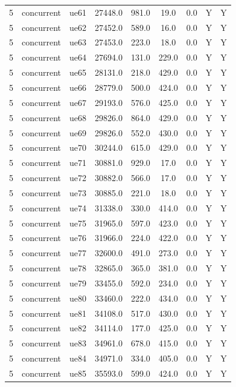 \begin{table}[ht]
\begin{tabular}{|c|c|c|c|c|c|c|c|c|}
5 & concurrent & ue61 & 27448.0 & 981.0 & 19.0 & 0.0 & Y & Y \\
5 & concurrent & ue62 & 27452.0 & 589.0 & 16.0 & 0.0 & Y & Y \\
5 & concurrent & ue63 & 27453.0 & 223.0 & 18.0 & 0.0 & Y & Y \\
5 & concurrent & ue64 & 27694.0 & 131.0 & 229.0 & 0.0 & Y & Y \\
5 & concurrent & ue65 & 28131.0 & 218.0 & 429.0 & 0.0 & Y & Y \\
5 & concurrent & ue66 & 28779.0 & 500.0 & 424.0 & 0.0 & Y & Y \\
5 & concurrent & ue67 & 29193.0 & 576.0 & 425.0 & 0.0 & Y & Y \\
5 & concurrent & ue68 & 29826.0 & 864.0 & 429.0 & 0.0 & Y & Y \\
5 & concurrent & ue69 & 29826.0 & 552.0 & 430.0 & 0.0 & Y & Y \\
5 & concurrent & ue70 & 30244.0 & 615.0 & 429.0 & 0.0 & Y & Y \\
5 & concurrent & ue71 & 30881.0 & 929.0 & 17.0 & 0.0 & Y & Y \\
5 & concurrent & ue72 & 30882.0 & 566.0 & 17.0 & 0.0 & Y & Y \\
5 & concurrent & ue73 & 30885.0 & 221.0 & 18.0 & 0.0 & Y & Y \\
5 & concurrent & ue74 & 31338.0 & 330.0 & 414.0 & 0.0 & Y & Y \\
5 & concurrent & ue75 & 31965.0 & 597.0 & 423.0 & 0.0 & Y & Y \\
5 & concurrent & ue76 & 31966.0 & 224.0 & 422.0 & 0.0 & Y & Y \\
5 & concurrent & ue77 & 32600.0 & 491.0 & 273.0 & 0.0 & Y & Y \\
5 & concurrent & ue78 & 32865.0 & 365.0 & 381.0 & 0.0 & Y & Y \\
5 & concurrent & ue79 & 33455.0 & 592.0 & 234.0 & 0.0 & Y & Y \\
5 & concurrent & ue80 & 33460.0 & 222.0 & 434.0 & 0.0 & Y & Y \\
5 & concurrent & ue81 & 34108.0 & 517.0 & 430.0 & 0.0 & Y & Y \\
5 & concurrent & ue82 & 34114.0 & 177.0 & 425.0 & 0.0 & Y & Y \\
5 & concurrent & ue83 & 34961.0 & 678.0 & 415.0 & 0.0 & Y & Y \\
5 & concurrent & ue84 & 34971.0 & 334.0 & 405.0 & 0.0 & Y & Y \\
5 & concurrent & ue85 & 35593.0 & 599.0 & 424.0 & 0.0 & Y & Y \\

\end{tabular}
\end{table}
